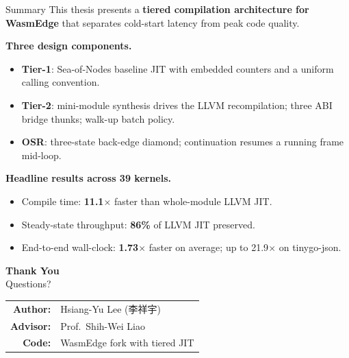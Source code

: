 \documentclass[aspectratio=169,11pt]{beamer}
\newcommand{\tone}{\textbf{\textcolor{tier1}{Tier-1}}}
\newcommand{\ttwo}{\textbf{\textcolor{tier2}{Tier-2}}}
\newcommand{\osr}{\textbf{\textcolor{osrcol}{OSR}}}
\newcommand{\code}[1]{{\ttfamily\small #1}}
\begin{document}
\begin{frame}{Summary}
  \small
  This thesis presents a \textbf{tiered compilation architecture for WasmEdge} that separates cold-start latency from peak code quality.

  \textbf{Three design components.}
  \begin{itemize}\setlength{\itemsep}{1pt}
    \item \tone{}: Sea-of-Nodes baseline JIT with embedded counters and a uniform calling convention.
    \item \ttwo{}: mini-module synthesis drives the LLVM recompilation; three ABI bridge thunks; walk-up batch policy.
    \item \osr{}: three-state back-edge diamond; continuation resumes a running frame mid-loop.
  \end{itemize}

  \textbf{Headline results across 39 kernels.}
  \begin{itemize}\setlength{\itemsep}{1pt}
    \item Compile time: \textbf{11.1$\times$} faster than whole-module LLVM JIT.
    \item Steady-state throughput: \textbf{86\%} of LLVM JIT preserved.
    \item End-to-end wall-clock: \textbf{1.73$\times$} faster on average; up to 21.9$\times$ on \code{tinygo-json}.
  \end{itemize}
\end{frame}

\begin{frame}[plain]
  \centering
  \vfill
  {\Huge\bfseries\color{nturoyal} Thank You}\\[1em]
  {\Large Questions?}\\[2em]
  \begin{tabular}{rl}
    \textbf{Author:}   & Hsiang-Yu Lee (李祥宇) \\
    \textbf{Advisor:}  & Prof.\ Shih-Wei Liao \\
    \textbf{Code:}     & WasmEdge fork with tiered JIT \\
  \end{tabular}
  \vfill
\end{frame}

\end{document}
